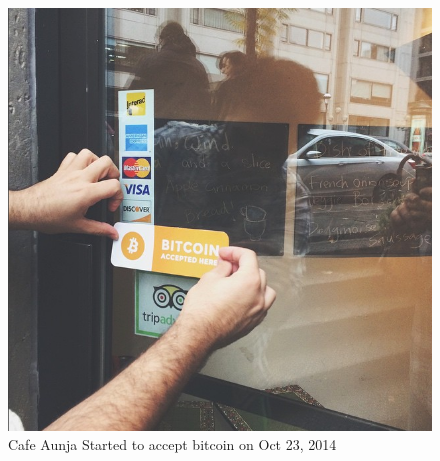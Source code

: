 \begin{figure}[htb]
\centering
\includegraphics[scale=0.5]{fig/cafeaunja.png}
  \caption{Cafe Aunja Started to accept bitcoin on Oct 23, 2014 }
\label{fig:cafeaunja}
\end{figure}




